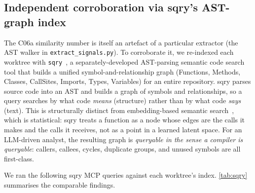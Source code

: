 \documentclass[11pt,letterpaper]{article}
\begin{document}
\subsection{Independent corroboration via sqry's AST-graph index}
\label{sec:sqry}

The C06a similarity number is itself an artefact of a particular
extractor (the AST walker in \texttt{extract\_signals.py}). To
corroborate it, we re-indexed each worktree with
\texttt{sqry}~\cite{verivus2026sqry}, a separately-developed
AST-parsing semantic code search tool that builds a unified
symbol-and-relationship graph (Functions, Methods, Classes,
CallSites, Imports, Types, Variables) for an entire repository. sqry
parses source code into an AST and builds a graph of symbols and
relationships, so a query searches by what code \emph{means}
(structure) rather than by what code \emph{says} (text). This is
structurally distinct from embedding-based semantic
search~\cite{feng2020codebert}, which is statistical: sqry treats a
function as a node whose edges are the calls it makes and the calls
it receives, not as a point in a learned latent space. For an
LLM-driven analyst, the resulting graph is \emph{queryable in the
sense a compiler is queryable}: callers, callees, cycles, duplicate
groups, and unused symbols are all first-class.

We ran the following sqry MCP queries against each worktree's
index. \cref{tab:sqry} summarises the comparable findings.
\end{document}
